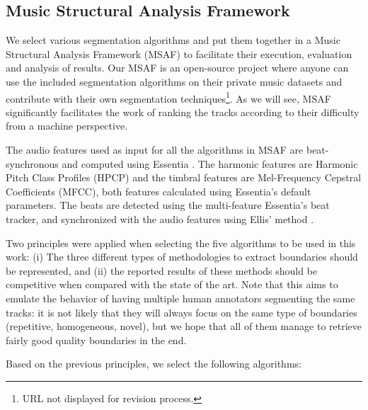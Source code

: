 \documentclass{article}
\begin{document}
\subsection{Music Structural Analysis Framework}

We select various segmentation algorithms and put them together in a Music Structural Analysis Framework (MSAF) to facilitate their execution, evaluation and analysis of results. 
Our MSAF is an open-source project where anyone can use the included segmentation algorithms on their private music datasets and contribute with their own segmentation techniques\footnote{URL not displayed for revision process.}.
As we will see, MSAF significantly facilitates the work of ranking the tracks according to their difficulty from a machine perspective.


The audio features used as input for all the algorithms in MSAF are beat-synchronous and computed using Essentia \cite{Bogdanov2013}.
The harmonic features are Harmonic Pitch Class Profiles (HPCP) and the timbral features are Mel-Frequency Cepstral Coefficients (MFCC), both features calculated using Essentia's default parameters.
The beats are detected using the multi-feature Essentia's beat tracker, and synchronized with the audio features using Ellis' method \cite{Ellis2007}.

Two principles were applied when selecting the five algorithms to be used in this work: (i) The three different types of methodologies to extract boundaries should be represented, and (ii) the reported results of these methods should be competitive when compared with the state of the art.
Note that this aims to emulate the behavior of having multiple human annotators segmenting the same tracks: it is not likely that they will always focus on the same type of boundaries (repetitive, homogeneous, novel), but we hope that all of them manage to retrieve fairly good quality boundaries in the end.

Based on the previous principles, we select the following algorithms:
\end{document}
